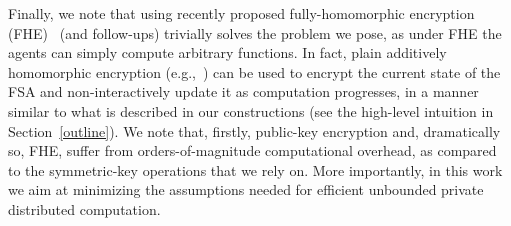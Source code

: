 \documentclass[letterpaper,11pt]{article}
\begin{document}
Finally, we note that using recently proposed fully-homomorphic encryption
(FHE)~\cite{DBLP:conf/stoc/Gentry09} (and follow-ups) trivially solves
the problem we pose, as under FHE the agents can simply compute arbitrary
functions. In fact, plain additively homomorphic encryption 
(e.g.,~\cite{EC:Paillier98}) can
be used to encrypt the current state of the FSA and non-interactively
update it as computation progresses, in a manner similar to what is
described in our constructions (see the high-level intuition in
Section~\ref{outline}).  We note that, firstly, public-key encryption
and, dramatically so, FHE, suffer from orders-of-magnitude
computational overhead, as compared to the symmetric-key operations that
we rely on.  More importantly, in this work we aim at minimizing
the assumptions needed for efficient unbounded private distributed
computation.
\end{document}
